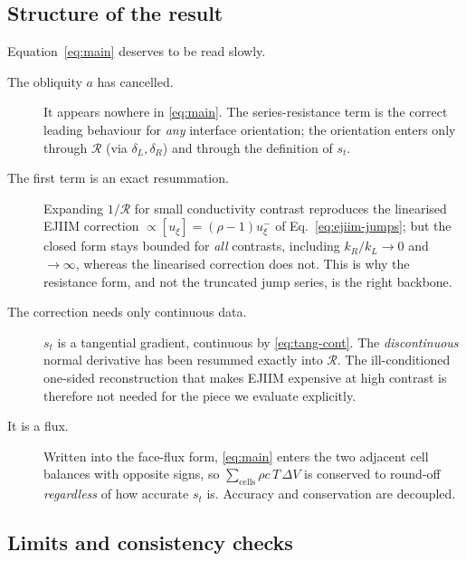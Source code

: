 \documentclass[11pt,a4paper]{article}
\newcommand{\jump}[1]{\left[#1\right]}
\newcommand{\Rser}{\mathcal{R}}
\begin{document}
\subsection{Structure of the result}

Equation~\eqref{eq:main} deserves to be read slowly.

\begin{description}
\item[The obliquity $a$ has cancelled.] It appears nowhere in
      \eqref{eq:main}. The series-resistance term is the correct leading
      behaviour for \emph{any} interface orientation; the orientation enters only
      through $\Rser$ (via $\delta_L,\delta_R$) and through the definition of
      $s_t$.
\item[The first term is an exact resummation.] Expanding
      $1/\Rser$ for small conductivity contrast reproduces the linearised
      EJIIM correction $\propto\jump{u_\xi}=(\rho-1)u^-_\xi$ of
      Eq.~\eqref{eq:ejiim-jumps}; but the closed form stays bounded for
      \emph{all} contrasts, including $k_R/k_L\to0$ and $\to\infty$, whereas the
      linearised correction does not. This is why the resistance form, and not
      the truncated jump series, is the right backbone.
\item[The correction needs only continuous data.] $s_t$ is a tangential
      gradient, continuous by \eqref{eq:tang-cont}. The \emph{discontinuous}
      normal derivative has been resummed exactly into $\Rser$. The
      ill-conditioned one-sided reconstruction that makes EJIIM expensive at high
      contrast is therefore not needed for the piece we evaluate explicitly.
\item[It is a flux.] Written into the face-flux form, \eqref{eq:main} enters the
      two adjacent cell balances with opposite signs, so
      $\sum_{\text{cells}}\rho c\,T\,\Delta V$ is conserved to round-off
      \emph{regardless} of how accurate $s_t$ is. Accuracy and conservation are
      decoupled.
\end{description}

\subsection{Limits and consistency checks}
\label{sec:limits}
\end{document}
